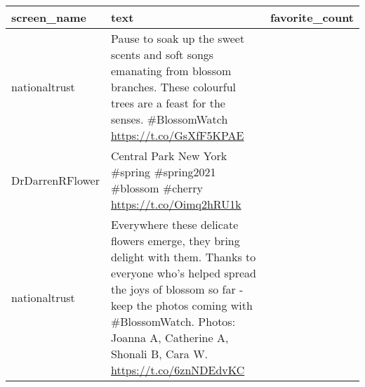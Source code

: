 \documentclass[
]{article}
\begin{document}
\begin{longtable}[]{@{}llr@{}}
\toprule
\begin{minipage}[b]{0.22\columnwidth}\raggedright
screen\_name\strut
\end{minipage} & \begin{minipage}[b]{0.49\columnwidth}\raggedright
text\strut
\end{minipage} & \begin{minipage}[b]{0.21\columnwidth}\raggedleft
favorite\_count\strut
\end{minipage}\tabularnewline
\midrule
\endhead
\begin{minipage}[t]{0.22\columnwidth}\raggedright
nationaltrust\strut
\end{minipage} & \begin{minipage}[t]{0.49\columnwidth}\raggedright
Pause to soak up the sweet scents and soft songs emanating from blossom
branches. These colourful trees are a feast for the senses.
\#BlossomWatch \url{https://t.co/GsXfF5KPAE}\strut
\end{minipage} & \begin{minipage}[t]{0.21\columnwidth}\raggedleft
1127\strut
\end{minipage}\tabularnewline
\begin{minipage}[t]{0.22\columnwidth}\raggedright
DrDarrenRFlower\strut
\end{minipage} & \begin{minipage}[t]{0.49\columnwidth}\raggedright
Central Park New York \#spring \#spring2021 \#blossom \#cherry
\url{https://t.co/Oimq2hRU1k}\strut
\end{minipage} & \begin{minipage}[t]{0.21\columnwidth}\raggedleft
835\strut
\end{minipage}\tabularnewline
\begin{minipage}[t]{0.22\columnwidth}\raggedright
nationaltrust\strut
\end{minipage} & \begin{minipage}[t]{0.49\columnwidth}\raggedright
Everywhere these delicate flowers emerge, they bring delight with them.
Thanks to everyone who's helped spread the joys of blossom so far - keep
the photos coming with \#BlossomWatch. Photos: Joanna A, Catherine A,
Shonali B, Cara W. \url{https://t.co/6znNDEdvKC}\strut
\end{minipage} & \begin{minipage}[t]{0.21\columnwidth}\raggedleft
697\strut
\end{minipage}\tabularnewline

\end{longtable}
\end{document}
